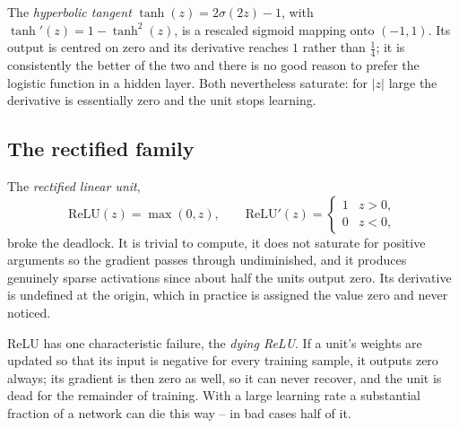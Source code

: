 The \emph{hyperbolic tangent} $\tanh(z)=2\sigma(2z)-1$, with
$\tanh'(z)=1-\tanh^{2}(z)$, is a rescaled sigmoid mapping onto $(-1,1)$.  Its
output is centred on zero and its derivative reaches $1$ rather than
$\tfrac14$; it is consistently the better of the two and there is no good
reason to prefer the logistic function in a hidden layer.  Both nevertheless
saturate: for $|z|$ large the derivative is essentially zero and the unit stops
learning.

\subsection{The rectified family}
\label{sec:reluact}

The \emph{rectified linear unit},
\begin{equation}
  \mathrm{ReLU}(z) = \max(0,z),
  \qquad
  \mathrm{ReLU}'(z) = \begin{cases}1 & z>0,\\ 0 & z<0,\end{cases}
  \label{eq:8-relu}
\end{equation}
broke the deadlock.  It is trivial to compute, it does not saturate for
positive arguments so the gradient passes through undiminished, and it produces
genuinely sparse activations since about half the units output zero.  Its
derivative is undefined at the origin, which in practice is assigned the value
zero and never noticed.

ReLU has one characteristic failure, the \emph{dying ReLU}.  If a unit's
weights are updated so that its input is negative for every training sample, it
outputs zero always; its gradient is then zero as well, so it can never
recover, and the unit is dead for the remainder of training.  With a large
learning rate a substantial fraction of a network can die this way -- in bad
cases half of it.


